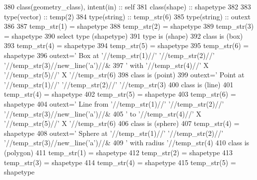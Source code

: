 \begin{DoxyCode}
380     \textcolor{keywordtype}{class}(geometry\_class), \textcolor{keywordtype}{intent(in)} :: self
381     \textcolor{keywordtype}{class}(shape) :: shapetype
382 
383     \textcolor{keywordtype}{type}(vector) :: temp(2)
384     \textcolor{keywordtype}{type}(string) :: temp\_str(6)
385     \textcolor{keywordtype}{type}(string) :: outext
386 
387     temp\_str(1) = shapetype%
388     temp\_str(2) = shapetype%
389     temp\_str(3) = shapetype%
390     \textcolor{keywordflow}{select type} (shapetype)
391 \textcolor{keywordflow}{    type is} (shape)
392 \textcolor{keywordflow}{    class is} (box)
393         temp\_str(4) = shapetype%
394         temp\_str(5) = shapetype%
395         temp\_str(6) = shapetype%
396         outext=\textcolor{stringliteral}{'      Box at '}//temp\_str(1)//\textcolor{stringliteral}{' '}//temp\_str(2)//\textcolor{stringliteral}{' '}//temp\_str(3)//new\_line(\textcolor{stringliteral}{'a'})//&
397             \textcolor{stringliteral}{'       with '}//temp\_str(4)//\textcolor{stringliteral}{' X '}//temp\_str(5)//\textcolor{stringliteral}{' X '}//temp\_str(6)
398 \textcolor{keywordflow}{    class is} (point)
399         outext=\textcolor{stringliteral}{'      Point at '}//temp\_str(1)//\textcolor{stringliteral}{' '}//temp\_str(2)//\textcolor{stringliteral}{' '}//temp\_str(3)
400 \textcolor{keywordflow}{    class is} (line)
401         temp\_str(4) = shapetype%
402         temp\_str(5) = shapetype%
403         temp\_str(6) = shapetype%
404         outext=\textcolor{stringliteral}{'      Line from '}//temp\_str(1)//\textcolor{stringliteral}{' '}//temp\_str(2)//\textcolor{stringliteral}{' '}//temp\_str(3)//new\_line(\textcolor{stringliteral}{'a'})//&
405             \textcolor{stringliteral}{'       to '}//temp\_str(4)//\textcolor{stringliteral}{' X '}//temp\_str(5)//\textcolor{stringliteral}{' X '}//temp\_str(6)
406 \textcolor{keywordflow}{    class is} (sphere)
407         temp\_str(4) = shapetype%
408         outext=\textcolor{stringliteral}{'      Sphere at '}//temp\_str(1)//\textcolor{stringliteral}{' '}//temp\_str(2)//\textcolor{stringliteral}{' '}//temp\_str(3)//new\_line(\textcolor{stringliteral}{'a'})//&
409             \textcolor{stringliteral}{'       with radius '}//temp\_str(4)
410 \textcolor{keywordflow}{    class is} (polygon)
411         temp\_str(1) = shapetype%
412         temp\_str(2) = shapetype%
413         temp\_str(3) = shapetype%
414         temp\_str(4) = shapetype%
415         temp\_str(5) = shapetype%

\end{DoxyCode}
